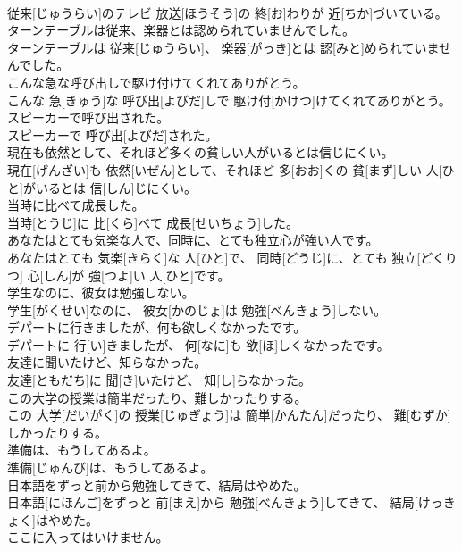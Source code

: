 \documentclass[8pt]{extreport}
\begin{document}
\begin{CJK}{UTF8}{min}
\\	従来[じゅうらい]のテレビ 放送[ほうそう]の 終[お]わりが 近[ちか]づいている。	
\\	ターンテーブルは従来、楽器とは認められていませんでした。	
\\	ターンテーブルは 従来[じゅうらい]、 楽器[がっき]とは 認[みと]められていませんでした。	
\\	こんな急な呼び出しで駆け付けてくれてありがとう。	
\\	こんな 急[きゅう]な 呼び出[よびだ]しで 駆け付[かけつ]けてくれてありがとう。	
\\	スピーカーで呼び出された。	
\\	スピーカーで 呼び出[よびだ]された。	
\\	現在も依然として、それほど多くの貧しい人がいるとは信じにくい。	
\\	現在[げんざい]も 依然[いぜん]として、それほど 多[おお]くの 貧[まず]しい 人[ひと]がいるとは 信[しん]じにくい。	
\\	当時に比べて成長した。	
\\	当時[とうじ]に 比[くら]べて 成長[せいちょう]した。	
\\	あなたはとても気楽な人で、同時に、とても独立心が強い人です。	
\\	あなたはとても 気楽[きらく]な 人[ひと]で、 同時[どうじ]に、とても 独立[どくりつ] 心[しん]が 強[つよ]い 人[ひと]です。	
\\	学生なのに、彼女は勉強しない。	
\\	学生[がくせい]なのに、 彼女[かのじょ]は 勉強[べんきょう]しない。	
\\	デパートに行きましたが、何も欲しくなかったです。	
\\	デパートに 行[い]きましたが、 何[なに]も 欲[ほ]しくなかったです。	
\\	友達に聞いたけど、知らなかった。	
\\	友達[ともだち]に 聞[き]いたけど、 知[し]らなかった。	
\\	この大学の授業は簡単だったり、難しかったりする。	
\\	この 大学[だいがく]の 授業[じゅぎょう]は 簡単[かんたん]だったり、 難[むずか]しかったりする。	
\\	準備は、もうしてあるよ。	
\\	準備[じゅんび]は、もうしてあるよ。	
\\	日本語をずっと前から勉強してきて、結局はやめた。	
\\	日本語[にほんご]をずっと 前[まえ]から 勉強[べんきょう]してきて、 結局[けっきょく]はやめた。	
\\	ここに入ってはいけません。	

\end{CJK}
\end{document}
